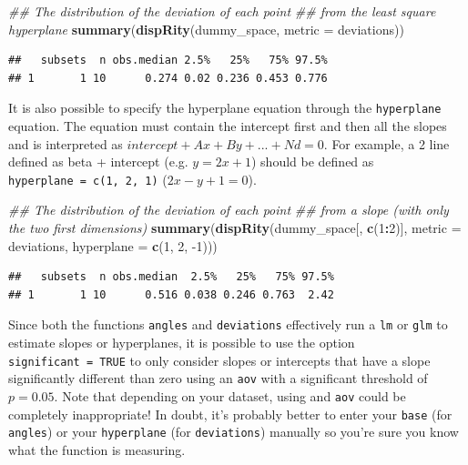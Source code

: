 \documentclass[]{book}
\newenvironment{Shaded}{\begin{snugshade}}{\end{snugshade}}
\newcommand{\CommentTok}[1]{\textcolor[rgb]{0.56,0.35,0.01}{\textit{#1}}}
\newcommand{\DataTypeTok}[1]{\textcolor[rgb]{0.13,0.29,0.53}{#1}}
\newcommand{\DecValTok}[1]{\textcolor[rgb]{0.00,0.00,0.81}{#1}}
\newcommand{\KeywordTok}[1]{\textcolor[rgb]{0.13,0.29,0.53}{\textbf{#1}}}
\newcommand{\NormalTok}[1]{#1}
\newcommand{\OperatorTok}[1]{\textcolor[rgb]{0.81,0.36,0.00}{\textbf{#1}}}
\begin{document}
\begin{Shaded}
\begin{Highlighting}[]
\CommentTok{## The distribution of the deviation of each point}
\CommentTok{## from the least square hyperplane}
\KeywordTok{summary}\NormalTok{(}\KeywordTok{dispRity}\NormalTok{(dummy_space, }\DataTypeTok{metric =}\NormalTok{ deviations))}
\end{Highlighting}
\end{Shaded}

\begin{verbatim}
##   subsets  n obs.median 2.5%   25%   75% 97.5%
## 1       1 10      0.274 0.02 0.236 0.453 0.776
\end{verbatim}

It is also possible to specify the hyperplane equation through the \texttt{hyperplane} equation. The equation must contain the intercept first and then all the slopes and is interpreted as \(intercept + Ax + By + ... + Nd = 0\). For example, a 2 line defined as beta + intercept (e.g. \(y = 2x + 1\)) should be defined as \texttt{hyperplane\ =\ c(1,\ 2,\ 1)} (\(2x - y + 1 = 0\)).

\begin{Shaded}
\begin{Highlighting}[]
\CommentTok{## The distribution of the deviation of each point}
\CommentTok{## from a slope (with only the two first dimensions)}
\KeywordTok{summary}\NormalTok{(}\KeywordTok{dispRity}\NormalTok{(dummy_space[, }\KeywordTok{c}\NormalTok{(}\DecValTok{1}\OperatorTok{:}\DecValTok{2}\NormalTok{)], }\DataTypeTok{metric =}\NormalTok{ deviations,}
                 \DataTypeTok{hyperplane =} \KeywordTok{c}\NormalTok{(}\DecValTok{1}\NormalTok{, }\DecValTok{2}\NormalTok{, }\DecValTok{-1}\NormalTok{)))}
\end{Highlighting}
\end{Shaded}

\begin{verbatim}
##   subsets  n obs.median  2.5%   25%   75% 97.5%
## 1       1 10      0.516 0.038 0.246 0.763  2.42
\end{verbatim}

Since both the functions \texttt{angles} and \texttt{deviations} effectively run a \texttt{lm} or \texttt{glm} to estimate slopes or hyperplanes, it is possible to use the option \texttt{significant\ =\ TRUE} to only consider slopes or intercepts that have a slope significantly different than zero using an \texttt{aov} with a significant threshold of \(p = 0.05\).
Note that depending on your dataset, using and \texttt{aov} could be completely inappropriate!
In doubt, it's probably better to enter your \texttt{base} (for \texttt{angles}) or your \texttt{hyperplane} (for \texttt{deviations}) manually so you're sure you know what the function is measuring.
\end{document}
